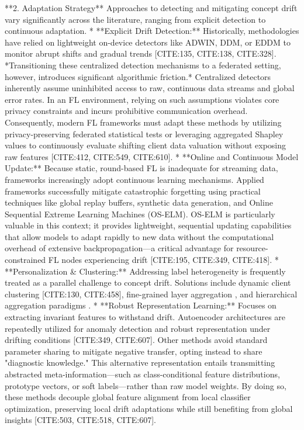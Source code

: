 \documentclass[journal]{IEEEtran}
\begin{document}
**2. Adaptation Strategy**
Approaches to detecting and mitigating concept drift vary significantly across the literature, ranging from explicit detection to continuous adaptation.
*   **Explicit Drift Detection:** Historically, methodologies have relied on lightweight on-device detectors like ADWIN, DDM, or EDDM to monitor abrupt shifts and gradual trends [CITE:135, CITE:138, CITE:328]. 
    *Transitioning these centralized detection mechanisms to a federated setting, however, introduces significant algorithmic friction.* Centralized detectors inherently assume uninhibited access to raw, continuous data streams and global error rates. In an FL environment, relying on such assumptions violates core privacy constraints and incurs prohibitive communication overhead. Consequently, modern FL frameworks must adapt these methods by utilizing privacy-preserving federated statistical tests or leveraging aggregated Shapley values to continuously evaluate shifting client data valuation without exposing raw features [CITE:412, CITE:549, CITE:610].
*   **Online and Continuous Model Update:** Because static, round-based FL is inadequate for streaming data, frameworks increasingly adopt continuous learning mechanisms. Applied frameworks successfully mitigate catastrophic forgetting using practical techniques like global replay buffers, synthetic data generation, and Online Sequential Extreme Learning Machines (OS-ELM). OS-ELM is particularly valuable in this context; it provides lightweight, sequential updating capabilities that allow models to adapt rapidly to new data without the computational overhead of extensive backpropagation—a critical advantage for resource-constrained FL nodes experiencing drift [CITE:195, CITE:349, CITE:418].
*   **Personalization \& Clustering:** Addressing label heterogeneity is frequently treated as a parallel challenge to concept drift. Solutions include dynamic client clustering [CITE:130, CITE:458], fine-grained layer aggregation \cite{Fu2025}, and hierarchical aggregation paradigms \cite{Aziz2025}.
*   **Robust Representation Learning:** Focuses on extracting invariant features to withstand drift. Autoencoder architectures are repeatedly utilized for anomaly detection and robust representation under drifting conditions [CITE:349, CITE:607]. Other methods avoid standard parameter sharing to mitigate negative transfer, opting instead to share "diagnostic knowledge." This alternative representation entails transmitting abstracted meta-information—such as class-conditional feature distributions, prototype vectors, or soft labels—rather than raw model weights. By doing so, these methods decouple global feature alignment from local classifier optimization, preserving local drift adaptations while still benefiting from global insights [CITE:503, CITE:518, CITE:607].
\end{document}
